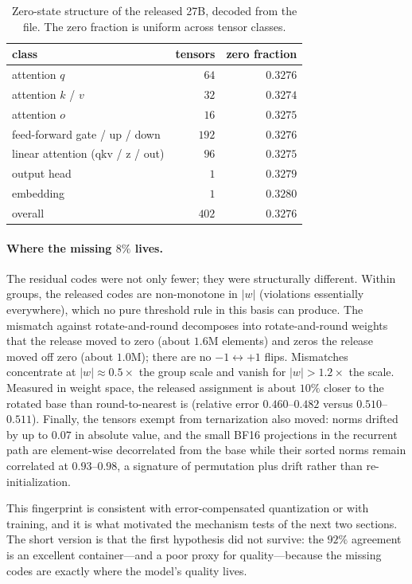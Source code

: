 \begin{table}[t]
\caption{Zero-state structure of the released 27B, decoded from the file.
The zero fraction is uniform across tensor classes.}
\label{tab:zero}
\begin{center}
\begin{tabular}{lrr}
\toprule
class & tensors & zero fraction \\
\midrule
attention $q$ & $64$ & $0.3276$ \\
attention $k$ / $v$ & $32$ & $0.3274$ \\
attention $o$ & $16$ & $0.3275$ \\
feed-forward gate / up / down & $192$ & $0.3276$ \\
linear attention (qkv / z / out) & $96$ & $0.3275$ \\
output head & $1$ & $0.3279$ \\
embedding & $1$ & $0.3280$ \\
\midrule
overall & $402$ & $\mathbf{0.3276}$ \\
\bottomrule
\end{tabular}
\end{center}
\end{table}

\paragraph{Where the missing $8\%$ lives.}
The residual codes were not only fewer; they were structurally different.
Within groups, the released codes are non-monotone in $|w|$ (violations
essentially everywhere), which no pure threshold rule in this basis can
produce. The mismatch against rotate-and-round decomposes into
rotate-and-round weights that the release moved to zero (about $1.6$M elements)
and zeros the release moved off zero (about $1.0$M); there are no
$-1 \leftrightarrow +1$ flips. Mismatches concentrate at $|w| \approx 0.5\times$
the group scale and vanish for $|w| > 1.2\times$ the scale. Measured in weight
space, the released assignment is about $10\%$ closer to the rotated base than
round-to-nearest is (relative error $0.460$--$0.482$ versus
$0.510$--$0.511$). Finally, the tensors exempt from ternarization also moved:
norms drifted by up to $0.07$ in absolute value, and the small BF16
projections in the recurrent path are element-wise decorrelated from the base
while their sorted norms remain correlated at $0.93$--$0.98$, a signature of
permutation plus drift rather than re-initialization.

This fingerprint is consistent with error-compensated quantization or with
training, and it is what motivated the mechanism tests of the next two
sections. The short version is that the first hypothesis did not survive: the
$92\%$ agreement is an excellent container---and a poor proxy for
quality---because the missing codes are exactly where the model's quality
lives.
